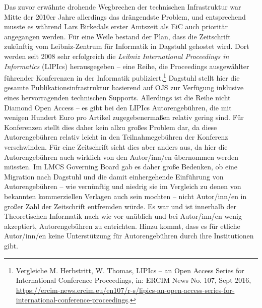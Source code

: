 \documentclass[a4paper,
fontsize=11pt,
oneside,
numbers=noperiodatend,
parskip=half-,
bibliography=totoc,
final
]{scrartcl}
\begin{document}
Das zuvor erwähnte drohende Wegbrechen der technischen Infrastruktur war
Mitte der 2010er Jahre allerdings das drängendste Problem, und
entsprechend musste es während Lars Birkedals erster Amtszeit als EiC
auch prioritär angegangen werden. Für eine Weile bestand der Plan, dass
die Zeitschrift zukünftig vom Leibniz-Zentrum für Informatik in Dagstuhl
gehostet wird. Dort werden seit 2008 sehr erfolgreich die \emph{Leibniz
International Proceedings in Informatics} (LIPIcs) herausgegeben -- eine
Reihe, die Proceedings ausgewählter führender Konferenzen in der
Informatik publiziert.\footnote{Vergleiche M. Herbstritt, W. Thomas,
  LIPIcs -- an Open Access Series for International Conference
  Proceedings, in: ERCIM News No. 107, Sept 2016,
  \url{https://ercim-news.ercim.eu/en107/r-s/lipics-an-open-access-series-for-international-conference-proceedings}.}
Dagstuhl stellt hier die gesamte Publikationsinfrastruktur basierend auf
OJS zur Verfügung inklusive eines hervorragenden technischen Supports.
Allerdings ist die Reihe nicht Diamond Open Access -- es gibt bei den
LIPIcs Autorengebühren, die mit wenigen Hundert Euro pro Artikel
zugegebenermaßen relativ gering sind. Für Konferenzen stellt dies daher
kein allzu großes Problem dar, da diese Autorengebühren relativ leicht
in den Teilnahmegebühren der Konferenz verschwinden. Für eine
Zeitschrift sieht dies aber anders aus, da hier die Autorengebühren auch
wirklich von den Autor/inn/en übernommen werden müssten. Im LMCS
Governing Board gab es daher große Bedenken, ob eine Migration nach
Dagstuhl und die damit einhergehende Einführung von Autorengebühren --
wie vernünftig und niedrig sie im Vergleich zu denen von bekannten
kommerziellen Verlagen auch sein mochten -- nicht Autor/inn/en in großer
Zahl der Zeitschrift entfremden würde. Es war und ist innerhalb der
Theoretischen Informatik nach wie vor unüblich und bei Autor/inn/en
wenig akzeptiert, Autorengebühren zu entrichten. Hinzu kommt, dass es
für etliche Autor/inn/en keine Unterstützung für Autorengebühren durch
ihre Institutionen gibt.
\end{document}
